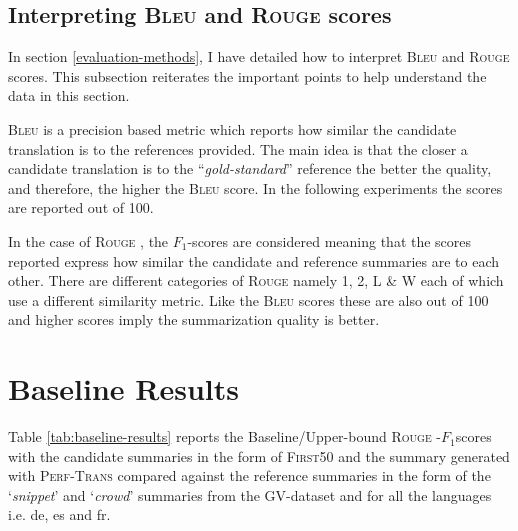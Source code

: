 \documentclass[12pt,a4paper,twoside,openright]{report}
\newcommand{\bleu}{\textsc{Bleu} }
\newcommand{\rouge}{\textsc{Rouge} }
\newcommand{\perftrans}{\textsc{Perf-Trans} }
\newcommand{\fone}{$F_1$}
\newenvironment{specialfootnote}
    {
    \renewcommand*{\thefootnote}{\fnsymbol{footnote}}
    }
    {
    \renewcommand*{\thefootnote}{\arabic{footnote}}
    }
\begin{document}


\subsection*{Interpreting \bleu and \rouge scores}
In section \ref{evaluation-methods}, I have detailed how to interpret \bleu and \rouge scores. This subsection reiterates the important points to help understand the data in this section.

\bleu is a precision based metric which reports how similar the candidate translation is to the references provided. The main idea is that the closer a candidate translation is to the ``\textit{gold-standard}'' reference the better the quality, and therefore, the higher the \bleu score. In the following experiments the scores are reported out of 100.

In the case of \rouge, the \fone-scores are considered meaning that the scores reported express how similar the candidate and reference summaries are to each other. There are different categories of \rouge namely 1, 2, L \& W each of which use a different similarity metric. Like the \bleu scores these are also out of 100 and higher scores imply the summarization quality is better.


\section{Baseline Results}
\label{baseline-results}




Table \ref{tab:baseline-results} reports the Baseline/Upper-bound \rouge-\fone scores with the candidate summaries in the form of \textsc{First50} and the summary generated with \perftrans compared against the reference summaries in the form of the `\textit{snippet}' and `\textit{crowd}' summaries from the GV-dataset and for all the languages i.e. de, es and fr.
\end{document}
